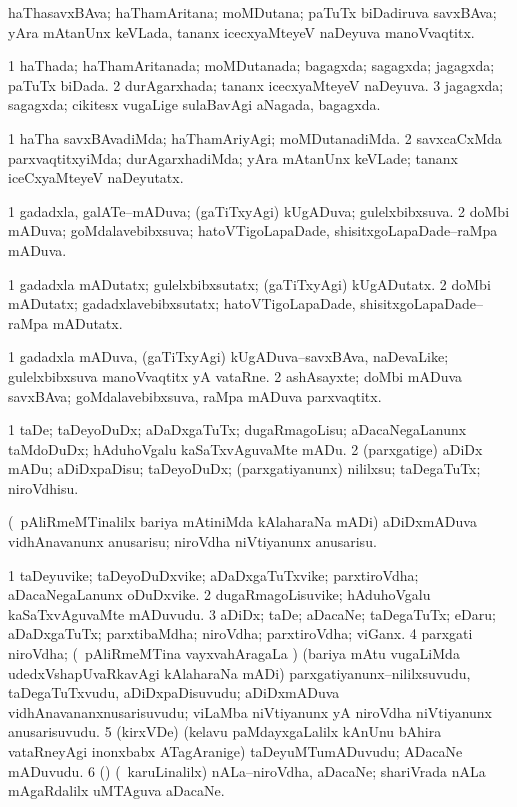 \bentry
{}
\gl{\nA}
\bmng
haThasavxBAva; haThamAritana; moMDutana; paTuTx biDadiruva savxBAva; yAra mAtanUnx keVLada, tananx icecxyaMteyeV naDeyuva manoVvaqtitx. 
\emng
\eentry

\bentry
{}
\gl{\gu}
\bmng
\bnum
\num{1} haThada; haThamAritanada; moMDutanada; bagagxda; sagagxda; jagagxda; paTuTx biDada. 
\num{2} durAgarxhada; tananx icecxyaMteyeV naDeyuva. 
\num{3} jagagxda; sagagxda; cikitesx \mo vugaLige sulaBavAgi aNagada, bagagxda. 
\enum
\emng
\eentry

\bentry
{}
\gl{\kirxvi}
\bmng
\bnum
\num{1} haTha savxBAvadiMda; haThamAriyAgi; moMDutanadiMda. 
\num{2} savxcaCxMda parxvaqtitxyiMda; durAgarxhadiMda; yAra mAtanUnx keVLade; tananx iceCxyaMteyeV naDeyutatx. 
\enum
\emng
\eentry

\bentry
{}
\gl{\gu}
\bmng
\bnum
\num{1} gadadxla, galATe--mADuva; (gaTiTxyAgi) kUgADuva; gulelxbibxsuva. 
\num{2} doMbi mADuva; goMdalavebibxsuva; hatoVTigoLapaDade, shisitxgoLapaDade--raMpa mADuva. 
\enum
\emng
\eentry

\bentry
{}
\gl{\kirxvi}
\bmng
\bnum
\num{1} gadadxla mADutatx; gulelxbibxsutatx; (gaTiTxyAgi) kUgADutatx. 
\num{2} doMbi mADutatx; gadadxlavebibxsutatx; hatoVTigoLapaDade, shisitxgoLapaDade--raMpa mADutatx. 
\enum
\emng
\eentry

\bentry
{}
\gl{\nA}
\bmng
\bnum
\num{1} gadadxla mADuva, (gaTiTxyAgi) kUgADuva--savxBAva, naDevaLike; gulelxbibxsuva manoVvaqtitx yA vataRne. 
\num{2} ashAsayxte; doMbi mADuva savxBAva; goMdalavebibxsuva, raMpa mADuva parxvaqtitx. 
\enum
\emng
\eentry

\bentry
{}
\gl{\sakirx}
\bmng
\bnum
\num{1} taDe; taDeyoDuDx; aDaDxgaTuTx; dugaRmagoLisu; aDacaNegaLanunx taMdoDuDx; hAduhoVgalu kaSaTxvAguvaMte mADu. 
\num{2} (parxgatige) aDiDx mADu; aDiDxpaDisu; taDeyoDuDx; (parxgatiyanunx) nililxsu; taDegaTuTx; niroVdhisu. 
\enum
\emng

\noindent
\gl{\akirx}
\bmng
(\kanmu\ pAliRmeMTinalilx bariya mAtiniMda kAlaharaNa mADi) aDiDxmADuva vidhAnavanunx anusarisu; niroVdha niVtiyanunx anusarisu. 
\emng
\eentry

\bentry
{}
\gl{\nA}
\bmng
\bnum
\num{1} taDeyuvike; taDeyoDuDxvike; aDaDxgaTuTxvike; parxtiroVdha; aDacaNegaLanunx oDuDxvike. 
\num{2} dugaRmagoLisuvike; hAduhoVgalu kaSaTxvAguvaMte mADuvudu. 
\num{3} aDiDx; taDe; aDacaNe; taDegaTuTx; eDaru; aDaDxgaTuTx; parxtibaMdha; niroVdha; parxtiroVdha; viGanx. 
\num{4} parxgati niroVdha; (\kanmu\ pAliRmeMTina vayxvahAragaLa \vi) (bariya mAtu \mo vugaLiMda udedxVshapUvaRkavAgi kAlaharaNa mADi) parxgatiyanunx--nililxsuvudu, taDegaTuTxvudu, aDiDxpaDisuvudu; aDiDxmADuva vidhAnavananxnusarisuvudu; viLaMba niVtiyanunx yA niroVdha niVtiyanunx anusarisuvudu. 
\num{5} (kirxVDe) (kelavu paMdayxgaLalilx kAnUnu bAhira vataRneyAgi inonxbabx ATagAranige) taDeyuMTumADuvudu; ADacaNe mADuvudu. 
\num{6} (\veYshA) (\kanmu\ karuLinalilx) nALa--niroVdha, aDacaNe; shariVrada nALa mAgaRdalilx uMTAguva aDacaNe. 
\enum
\emng
\eentry

